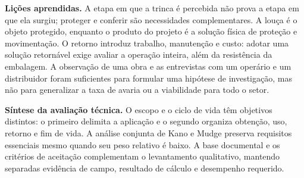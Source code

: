 \noindent\textbf{Lições aprendidas.} A etapa em que a trinca é percebida não prova a etapa em que ela surgiu; proteger e conferir são necessidades complementares. A louça é o objeto protegido, enquanto o produto do projeto é a solução física de proteção e movimentação. O retorno introduz trabalho, manutenção e custo: adotar uma solução retornável exige avaliar a operação inteira, além da resistência da embalagem. A observação de uma obra e as entrevistas com um operário e um distribuidor foram suficientes para formular uma hipótese de investigação, mas não para generalizar a taxa de avaria ou a viabilidade para todo o setor.

\noindent\textbf{Síntese da avaliação técnica.} O escopo e o ciclo de vida têm objetivos distintos: o primeiro delimita a aplicação e o segundo organiza obtenção, uso, retorno e fim de vida. A análise conjunta de Kano e Mudge preserva requisitos essenciais mesmo quando seu peso relativo é baixo. A base documental e os critérios de aceitação complementam o levantamento qualitativo, mantendo separadas evidência de campo, resultado de cálculo e desempenho requerido.

